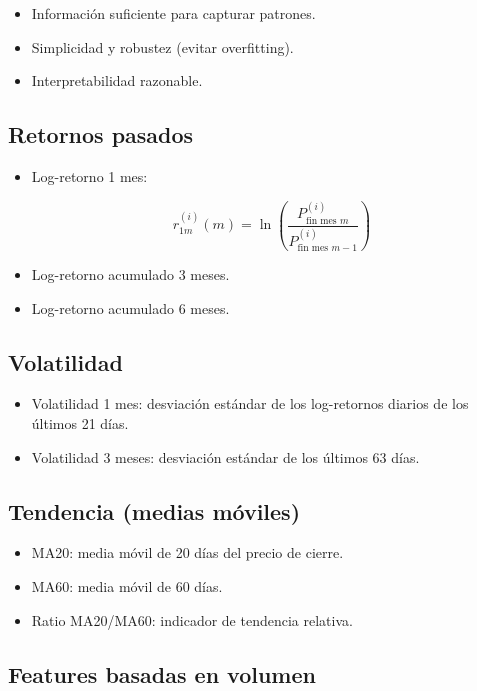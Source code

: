 \documentclass[12pt]{article}
\begin{document}
\begin{itemize}
    \item Información suficiente para capturar patrones.
    \item Simplicidad y robustez (evitar overfitting).
    \item Interpretabilidad razonable.
\end{itemize}

\subsection{Retornos pasados}

\begin{itemize}
    \item Log-retorno 1 mes:
    

\[
    r_{1m}^{(i)}(m) = \ln\left(\frac{P_{\text{fin mes } m}^{(i)}}{P_{\text{fin mes } m-1}^{(i)}}\right)
    \]


    \item Log-retorno acumulado 3 meses.
    \item Log-retorno acumulado 6 meses.
\end{itemize}

\subsection{Volatilidad}

\begin{itemize}
    \item Volatilidad 1 mes: desviación estándar de los log-retornos diarios de los últimos 21 días.
    \item Volatilidad 3 meses: desviación estándar de los últimos 63 días.
\end{itemize}

\subsection{Tendencia (medias móviles)}

\begin{itemize}
    \item MA20: media móvil de 20 días del precio de cierre.
    \item MA60: media móvil de 60 días.
    \item Ratio MA20/MA60: indicador de tendencia relativa.
\end{itemize}

\subsection{Features basadas en volumen}
\end{document}
